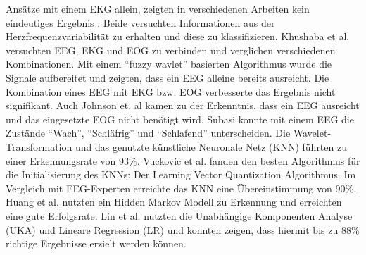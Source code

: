 Ansätze mit einem EKG allein, zeigten in verschiedenen Arbeiten kein eindeutiges Ergebnis \cite{Vicente_6164509}\cite{Rogado_4913155}. Beide versuchten Informationen aus der Herzfrequenzvariabilität zu erhalten und diese zu klassifizieren. 
Khushaba et al. \cite{Khushaba_5580017} versuchten EEG, EKG und EOG zu verbinden und verglichen verschiedenen Kombinationen. Mit einem "`fuzzy wavlet"' basierten Algorithmus wurde die Signale aufbereitet und zeigten, dass ein EEG alleine bereits ausreicht. Die Kombination eines EEG mit EKG bzw. EOG verbesserte das Ergebnis nicht signifikant. Auch Johnson et. al \cite{Johnson11} kamen zu der Erkenntnis, dass ein EEG ausreicht und das eingesetzte EOG nicht benötigt wird. Subasi \cite{Subasi:2005:ARA:1707423.1707550} konnte mit einem EEG die Zustände "`Wach"', "`Schläfrig"' und "`Schlafend"' unterscheiden. Die Wavelet-Transformation und das genutzte künstliche Neuronale Netz (KNN) führten zu einer Erkennungsrate von 93\%. Vuckovic et al. \cite{Vuckovic2002349} fanden den besten Algorithmus für die Initialisierung des KNNs: Der Learning Vector Quantization Algorithmus. Im Vergleich mit EEG-Experten erreichte das KNN eine Übereinstimmung von 90\%. Huang et al. \cite{Huang_548971} nutzten ein Hidden Markov Modell zu Erkennung und erreichten eine gute Erfolgsrate. Lin et al. \cite{Lin05eeg-baseddrowsiness} nutzten die Unabhängige Komponenten Analyse (UKA) und Lineare Regression (LR) und konnten zeigen, dass hiermit  bis zu 88\% richtige Ergebnisse erzielt werden können. 


